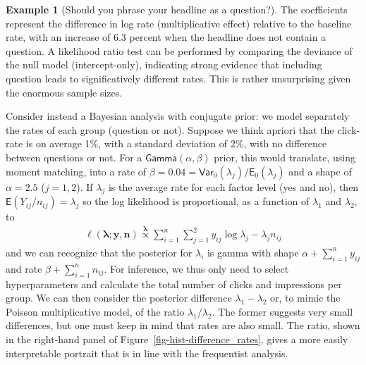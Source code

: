 \documentclass[
  11pt,
  letterpaper,
]{scrbook}
\theoremstyle{definition}
\theoremstyle{definition}
\newtheorem{example}{Example}[chapter]
\theoremstyle{definition}
\theoremstyle{plain}
\theoremstyle{plain}
\theoremstyle{remark}
\begin{document}
\begin{example}[Should you phrase your headline as a
question?]
The coefficients represent the difference in log rate (multiplicative
effect) relative to the baseline rate, with an increase of 6.3 percent
when the headline does not contain a question. A likelihood ratio test
can be performed by comparing the deviance of the null model
(intercept-only), indicating strong evidence that including question
leads to significatively different rates. This is rather unsurprising
given the enormous sample sizes.

Consider instead a Bayesian analysis with conjugate prior: we model
separately the rates of each group (question or not). Suppose we think
apriori that the click-rate is on average 1\%, with a standard deviation
of 2\%, with no difference between questions or not. For a
\(\mathsf{Gamma}(\alpha, \beta)\) prior, this would translate, using
moment matching, into a rate of
\(\beta = 0.04 = \mathsf{Var}_0(\lambda_j)/\mathsf{E}_0(\lambda_j)\) and
a shape of \(\alpha = 2.5\) (\(j=1, 2\)). If \(\lambda_{j}\) is the
average rate for each factor level (yes and no), then
\(\mathsf{E}(Y_{ij}/n_{ij}) = \lambda_j\) so the log likelihood is
proportional, as a function of \(\lambda_1\) and \(\lambda_2\), to
\begin{align*}
\ell(\boldsymbol{\lambda}; \boldsymbol{y}, \boldsymbol{n}) \stackrel{\boldsymbol{\lambda}}{\propto} \sum_{i=1}^n \sum_{j=1}^2 y_{ij}\log \lambda_j - \lambda_jn_{ij}
\end{align*} and we can recognize that the posterior for \(\lambda_i\)
is gamma with shape \(\alpha + \sum_{i=1}^n y_{ij}\) and rate
\(\beta + \sum_{i=1}^n n_{ij}.\) For inference, we thus only need to
select hyperparameters and calculate the total number of clicks and
impressions per group. We can then consider the posterior difference
\(\lambda_1 - \lambda_2\) or, to mimic the Poisson multiplicative model,
of the ratio \(\lambda_1/\lambda_2\). The former suggests very small
differences, but one must keep in mind that rates are also small. The
ratio, shown in the right-hand panel of
Figure~\ref{fig-hist-difference_rates}, gives a more easily
interpretable portrait that is in line with the frequentist analysis.

\begin{figure}[ht!]

\centering{

}
\end{figure}
\end{example}
\end{document}

